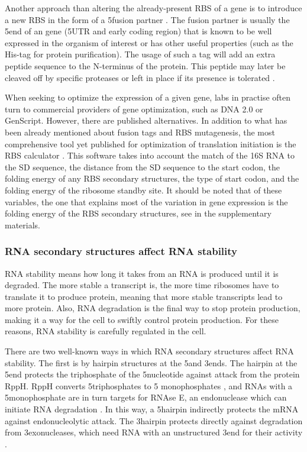 Another approach than altering the already-present RBS of a gene is to
introduce a new RBS in the form of a 5\p fusion partner
\cite{lavallie_gene_1995}. The fusion partner is usually the 5\p end of an gene
(5\p UTR and early coding region) that is known to be well expressed in the
organism of interest or has other useful properties (such as the His-tag for
protein purification). The usage of such a tag will add an extra peptide
sequence to the N-terminus of the protein. This peptide may later be cleaved
off by specific proteases or left in place if its presence is tolerated
\cite{esposito_enhancement_2006}.

When seeking to optimize the expression of a given gene, labs in practise often
turn to commercial providers of gene optimization, such as DNA 2.0 or
GenScript. However, there are published alternatives. In addition to what has
been already mentioned about fusion tags and RBS mutagenesis, the most
comprehensive tool yet published for optimization of translation initiation
is the RBS calculator \cite{salis_automated_2009}. This software takes into
account the match of the 16S RNA to the SD sequence, the distance from the SD
sequence to the start codon, the folding energy of any RBS secondary
structures, the type of start codon, and the folding energy of the ribosome
standby site. It should be noted that of these variables, the one that explains
most of the variation in gene expression is the folding energy of the RBS
secondary structures, see \cite{salis_automated_2009} in the supplementary
materials.

\subsubsection{RNA secondary structures affect RNA stability} RNA stability
means how long it takes from an RNA is produced until it is degraded. The more
stable a transcript is, the more time ribosomes have to translate it to produce
protein, meaning that more stable transcripts lead to more protein. Also, RNA
degradation is the final way to stop protein production, making it a way for
the cell to swiftly control protein production.  For these reasons, RNA
stability is carefully regulated in the cell.

There are two well-known ways in which RNA secondary structures affect RNA
stability. The first is by hairpin structures at the 5\p and 3\p ends. The
hairpin at the 5\p end protects the triphosphate of the 5\p nucleotide against
attack from the protein RppH. RppH converts 5\p triphosphates to 5\p
monophosphates \cite{deana_bacterial_2008}, and RNAs with a 5\p monophosphate
are in turn targets for RNAse E, an endonuclease which can initiate RNA
degradation \cite{mackie_ribonuclease_1998}. In this way, a 5\p hairpin
indirectly protects the mRNA against endonucleolytic attack. The 3\p hairpin
protects directly against degradation from 3\p exonucleases, which need RNA
with an unstructured 3\p end for their activity \cite{rauhut_mrna_1999}.

